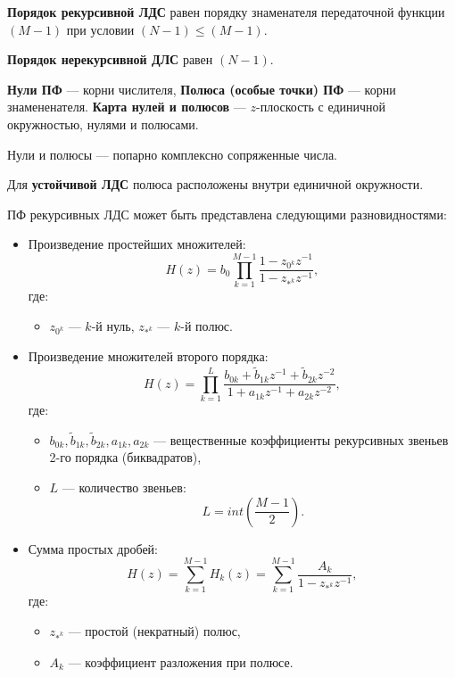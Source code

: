 \documentclass[a4paper, 14pt]{extarticle}
\begin{document}
\textbf{Порядок рекурсивной ЛДС} равен порядку знаменателя передаточной функции $(M-1)$ при условии $(N-1) \le (M-1)$.

\textbf{Порядок нерекурсивной ДЛС} равен $(N-1)$.

\textbf{Нули ПФ} --- корни числителя, \textbf{Полюса (особые точки) ПФ} --- корни знамененателя. \textbf{Карта нулей и полюсов} --- $z$-плоскость с единичной окружностью, нулями и полюсами.

Нули и полюсы --- попарно комплексно сопряженные числа.

Для \textbf{устойчивой ЛДС} полюса расположены внутри единичной окружности.

ПФ рекурсивных ЛДС может быть представлена следующими разновидностями:
\begin{itemize}
    \item Произведение простейших множителей:
        \begin{equation}
            H(z) = b_0 \prod^{M-1}_{k=1} \frac{1 - z_{0^k}z^{-1}}{1-z_{*^k}z^{-1}},
        \end{equation}
        где:
        \begin{itemize}
            \item $z_{0^k}$ --- $k$-й нуль, $z_{*^k}$ --- $k$-й полюс.
        \end{itemize}
    \item Произведение множителей второго порядка:
        \begin{equation}
            H(z) = \prod^{L}_{k=1} \frac{b_{0k} + \tilde{b}_{1k} z^{-1} + \tilde{b}_{2k}z^{-2}}{1 + a_{1k} z^{-1} + a_{2k} z^{-2}},
        \end{equation}
        где:
        \begin{itemize}
            \item $b_{0k}, \tilde{b}_{1k}, \tilde{b}_{2k}, a_{1k}, a_{2k}$ --- вещественные коэффициенты рекурсивных звеньев 2-го порядка (биквадратов),
            \item $L$ --- количество звеньев:
                \begin{equation}
                L = int( \frac{M-1}{2} ).
                \end{equation}
        \end{itemize}
    \item Сумма простых дробей:
        \begin{equation}
            H(z) = \sum^{M-1}_{k=1} H_k(z) = \sum^{M-1}_{k=1} \frac{A_k}{1-z_{*^k}z^{-1}},
        \end{equation}
        где:
        \begin{itemize}
            \item $z_{*^k}$ --- простой (некратный) полюс,
            \item $A_k$ --- коэффициент разложения при полюсе.
        \end{itemize}
\end{itemize}
\end{document}
